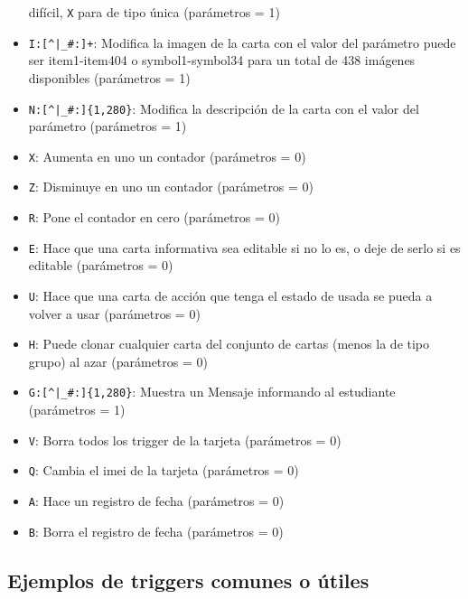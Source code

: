 \begin{definition}
\begin{itemize}
			difícil, {\Large\color{blue} \verb/X/} para de tipo única (parámetros = 1)
		\item {\Large\color{blue} \verb/I:[^|_#:]+/}: Modifica la imagen de la carta con el valor del 
			parámetro puede ser item1-item404 o symbol1-symbol34 para un total de 438 imágenes 
			disponibles (parámetros = 1)
		\item {\Large\color{blue} \verb/N:[^|_#:]{1,280}/}: Modifica la descripción de la carta con el 
			valor del parámetro (parámetros = 1)
		\item {\Large\color{blue} \verb/X/}: Aumenta en uno un contador (parámetros = 0)
		\item {\Large\color{blue} \verb/Z/}: Disminuye en uno un contador (parámetros = 0)
		\item {\Large\color{blue} \verb/R/}: Pone el contador en cero (parámetros = 0)
		\item {\Large\color{blue} \verb/E/}: Hace que una carta informativa sea editable si no lo es, 
			o deje de serlo si es editable (parámetros = 0)
		\item {\Large\color{blue} \verb/U/}: Hace que una carta de acción que tenga el estado de usada 
			se pueda a volver a usar (parámetros = 0)
		\item {\Large\color{blue} \verb/H/}: Puede clonar cualquier carta del conjunto de cartas 
			(menos la de tipo grupo) al azar (parámetros = 0)
		\item {\Large\color{blue} \verb/G:[^|_#:]{1,280}/}: Muestra un Mensaje informando al estudiante
			(parámetros = 1)
		\item {\Large\color{blue} \verb/V/}: Borra todos los trigger de la tarjeta (parámetros = 0)
		\item {\Large\color{blue} \verb/Q/}: Cambia el imei de la tarjeta (parámetros = 0)
		\item {\Large\color{blue} \verb/A/}: Hace un registro de fecha (parámetros = 0)
		\item {\Large\color{blue} \verb/B/}: Borra el registro de fecha (parámetros = 0)
	\end{itemize}

\end{definition}

\subsection{Ejemplos de triggers comunes o útiles}

